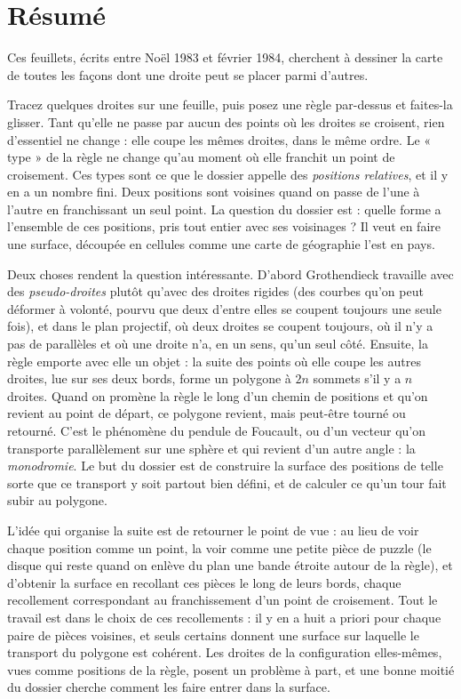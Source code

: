 \documentclass[11pt,a4paper]{article}
\begin{document}
\section*{Résumé}

\begin{resume}
Ces feuillets, écrits entre Noël 1983 et février 1984, cherchent à dessiner la
carte de toutes les façons dont une droite peut se placer parmi d'autres.

Tracez quelques droites sur une feuille, puis posez une règle par-dessus et
faites-la glisser. Tant qu'elle ne passe par aucun des points où les droites se
croisent, rien d'essentiel ne change : elle coupe les mêmes droites, dans le
même ordre. Le « type » de la règle ne change qu'au moment où elle franchit un
point de croisement. Ces types sont ce que le dossier appelle des
\emph{positions relatives}, et il y en a un nombre fini. Deux positions sont
voisines quand on passe de l'une à l'autre en franchissant un seul point. La
question du dossier est : quelle forme a l'ensemble de ces positions, pris
tout entier avec ses voisinages ? Il veut en faire une surface, découpée en
cellules comme une carte de géographie l'est en pays.

Deux choses rendent la question intéressante. D'abord Grothendieck travaille
avec des \emph{pseudo-droites} plutôt qu'avec des droites rigides (des courbes
qu'on peut déformer à volonté, pourvu que deux d'entre elles se coupent toujours
une seule fois), et dans le plan projectif, où deux droites se coupent
toujours, où il n'y a pas de parallèles et où une droite n'a, en un sens, qu'un
seul côté. Ensuite, la règle emporte avec elle un objet : la suite des points
où elle coupe les autres droites, lue sur ses deux bords, forme un polygone à
$2n$ sommets s'il y a $n$ droites. Quand on promène la règle le long d'un chemin
de positions et qu'on revient au point de départ, ce polygone revient, mais
peut-être tourné ou retourné. C'est le phénomène du pendule de Foucault, ou d'un
vecteur qu'on transporte parallèlement sur une sphère et qui revient d'un autre
angle : la \emph{monodromie}. Le but du dossier est de construire la surface des
positions de telle sorte que ce transport y soit partout bien défini, et de
calculer ce qu'un tour fait subir au polygone.

L'idée qui organise la suite est de retourner le point de vue :
au lieu de voir chaque position comme un point, la voir comme une petite pièce
de puzzle (le disque qui reste quand on enlève du plan une bande étroite
autour de la règle), et d'obtenir la surface en recollant ces pièces le long de
leurs bords, chaque recollement correspondant au franchissement d'un point de
croisement. Tout le travail est dans le choix de ces recollements : il y en a
huit a priori pour chaque paire de pièces voisines, et seuls certains donnent
une surface sur laquelle le transport du polygone est cohérent. Les droites de
la configuration elles-mêmes, vues comme positions de la règle, posent un
problème à part, et une bonne moitié du dossier cherche comment les faire
entrer dans la surface.


\end{resume}
\end{document}
